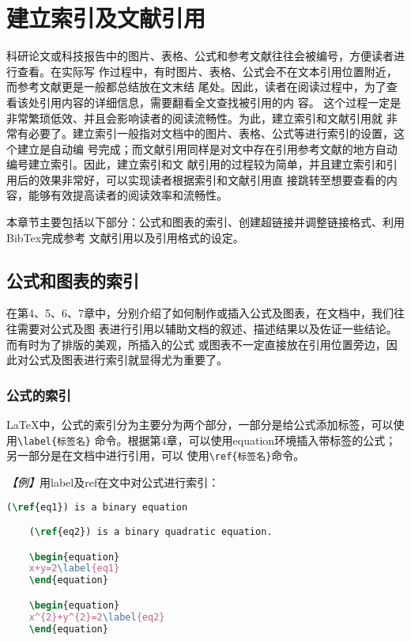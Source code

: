 \chapter{建立索引及文献引用}

科研论文或科技报告中的图片、表格、公式和参考文献往往会被编号，方便读者进行查看。在实际写
作过程中，有时图片、表格、公式会不在文本引用位置附近，而参考文献更是一般都总结放在文末结
尾处。因此，读者在阅读过程中，为了查看该处引用内容的详细信息，需要翻看全文查找被引用的内
容。 这个过程一定是非常繁琐低效、并且会影响读者的阅读流畅性。为此，建立索引和文献引用就
非常有必要了。建立索引一般指对文档中的图片、表格、公式等进行索引的设置，这个建立是自动编
号完成；而文献引用同样是对文中存在引用参考文献的地方自动编号建立索引。因此，建立索引和文
献引用的过程较为简单，并且建立索引和引用后的效果非常好，可以实现读者根据索引和文献引用直
接跳转至想要查看的内容，能够有效提高读者的阅读效率和流畅性。

本章节主要包括以下部分：公式和图表的索引、创建超链接并调整链接格式、利用BibTex完成参考
文献引用以及引用格式的设定。

\section{公式和图表的索引}

在第4、5、6、7章中，分别介绍了如何制作或插入公式及图表，在文档中，我们往往需要对公式及图
表进行引用以辅助文档的叙述、描述结果以及佐证一些结论。而有时为了排版的美观，所插入的公式
或图表不一定直接放在引用位置旁边，因此对公式及图表进行索引就显得尤为重要了。

\subsection{公式的索引}

LaTeX中，公式的索引分为主要分为两个部分，一部分是给公式添加标签，可以使用\texttt{\textbackslash{}label\{标签名\}}
命令。根据第4章，可以使用equation环境插入带标签的公式；另一部分是在文档中进行引用，可以
使用\texttt{\textbackslash{}ref\{标签名\}}命令。

\emph{【例】}用label及ref在文中对公式进行索引：
\begin{lstlisting}[language=TeX]
    (\ref{eq1}) is a binary equation

    (\ref{eq2}) is a binary quadratic equation.

    \begin{equation}
    x+y=2\label{eq1}
    \end{equation}

    \begin{equation}
    x^{2}+y^{2}=2\label{eq2}
    \end{equation}
\end{lstlisting}

